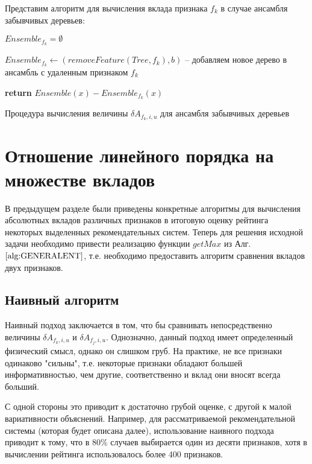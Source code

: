 \documentclass[12pt,a4paper]{report}
\begin{document}
Представим алгоритм для вычисления вклада признака $f_k$ в случае ансамбля забывчивых деревьев:

\begin{algorithm}[H]
\SetAlgoLined
{}

$Ensemble_{f_k} = \emptyset$

 {

	$Ensemble_{f_k} \leftarrow (removeFeature(Tree, f_k), b)$ -- добавляем новое дерево в ансамбль с удаленным признаком $f_k$
	
}

\textbf{return} $Ensemble(x) - Ensemble_{f_k}(x)$
\caption{Процедура вычисления величины $\delta A_{f_k, i, u}$ для ансамбля забывчивых деревьев}
\label{alg:CFIOT}
\end{algorithm}

\section{Отношение линейного порядка на множестве вкладов}
В предыдущем разделе были приведены конкретные алгоритмы для вычисления абсолютных вкладов различных признаков в итоговую оценку рейтинга некоторых выделенных рекомендательных систем. Теперь для решения исходной задачи необходимо привести реализацию функции $getMax$ из Алг. $\ref{alg:GENERALENT}$, т.е. необходимо предоставить алгоритм сравнения вкладов двух признаков.

\subsection{Наивный алгоритм}
Наивный подход заключается в том, что бы сравнивать непосредственно величины $\delta A_{f_k, i, u}$ и $\delta A_{f_j, i, u}$. Однозначно, данный подход имеет определенный физический смысл, однако он слишком груб. На практике, не все признаки одинаково "сильны", т.е. некоторые признаки обладают большей информативностью, чем другие, соответственно и вклад они вносят всегда больший.

С одной стороны это приводит к достаточно грубой оценке, с другой к малой вариативности объяснений.
Например, для рассматриваемой рекомендательной системы (которая будет описана далее), использование наивного подхода приводит к тому, что в 80\% случаев выбирается один из десяти признаков, хотя в вычислении рейтинга использовалось более 400 признаков.
\end{document}
